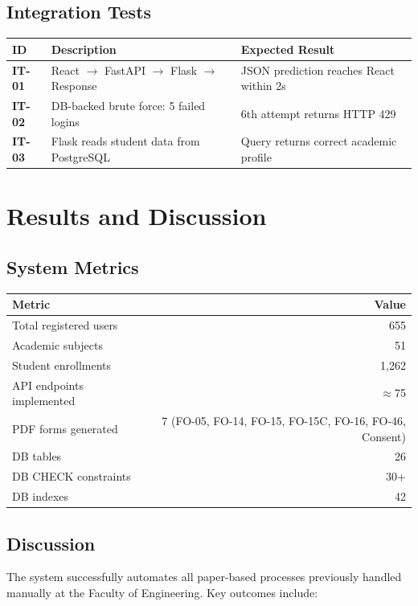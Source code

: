 \documentclass[12pt,a4paper]{article}
\begin{document}
\subsection{Integration Tests}
\begin{longtable}{>{\bfseries}p{1.3cm} p{5cm} p{6cm}}
  \toprule
  \textbf{ID} & \textbf{Description} & \textbf{Expected Result} \\
  \midrule
  IT-01 & React $\to$ FastAPI $\to$ Flask $\to$ Response & JSON prediction reaches React within 2s \\
  IT-02 & DB-backed brute force: 5 failed logins & 6th attempt returns HTTP 429 \\
  IT-03 & Flask reads student data from PostgreSQL & Query returns correct academic profile \\
  \bottomrule
\end{longtable}

\section{Results and Discussion}

\subsection{System Metrics}
\begin{center}
\begin{tabular}{lr}
  \toprule
  \textbf{Metric} & \textbf{Value} \\
  \midrule
  Total registered users    & 655 \\
  Academic subjects         & 51 \\
  Student enrollments       & 1,262 \\
  API endpoints implemented & $\approx$75 \\
  PDF forms generated       & 7 (FO-05, FO-14, FO-15, FO-15C, FO-16, FO-46, Consent) \\
  DB tables                 & 26 \\
  DB CHECK constraints      & 30+ \\
  DB indexes                & 42 \\
  \bottomrule
\end{tabular}
\end{center}

\subsection{Discussion}
The system successfully automates all paper-based processes previously handled manually at the
Faculty of Engineering. Key outcomes include:
\end{document}
